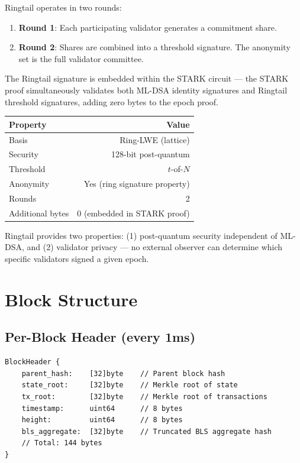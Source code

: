 \documentclass[11pt,a4paper]{article}
\begin{document}
Ringtail operates in two rounds:

\begin{enumerate}[leftmargin=2em]
\item \textbf{Round 1}: Each participating validator generates a commitment share.
\item \textbf{Round 2}: Shares are combined into a threshold signature. The anonymity set is the full validator committee.
\end{enumerate}

The Ringtail signature is embedded within the STARK circuit --- the STARK proof simultaneously validates both ML-DSA identity signatures and Ringtail threshold signatures, adding zero bytes to the epoch proof.

\begin{center}
\begin{tabular}{lr}
\toprule
\textbf{Property} & \textbf{Value} \\
\midrule
Basis & Ring-LWE (lattice) \\
Security & 128-bit post-quantum \\
Threshold & $t$-of-$N$ \\
Anonymity & Yes (ring signature property) \\
Rounds & 2 \\
Additional bytes & 0 (embedded in STARK proof) \\
\bottomrule
\end{tabular}
\end{center}

Ringtail provides two properties: (1) post-quantum security independent of ML-DSA, and (2) validator privacy --- no external observer can determine which specific validators signed a given epoch.

\section{Block Structure}

\subsection{Per-Block Header (every 1ms)}

\begin{verbatim}
BlockHeader {
    parent_hash:    [32]byte    // Parent block hash
    state_root:     [32]byte    // Merkle root of state
    tx_root:        [32]byte    // Merkle root of transactions
    timestamp:      uint64      // 8 bytes
    height:         uint64      // 8 bytes
    bls_aggregate:  [32]byte    // Truncated BLS aggregate hash
    // Total: 144 bytes
}
\end{verbatim}
\end{document}
